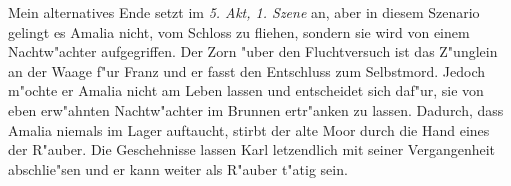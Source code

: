 Mein alternatives Ende setzt im \textit{5. Akt, 1. Szene} an, aber in diesem Szenario gelingt es Amalia nicht, vom Schloss zu fliehen, sondern sie wird von einem Nachtw"achter aufgegriffen. Der Zorn "uber den Fluchtversuch ist das Z"unglein an der Waage f"ur Franz und er fasst den Entschluss zum Selbstmord. Jedoch m"ochte er Amalia nicht am Leben lassen und entscheidet sich daf"ur, sie von eben erw"ahnten Nachtw"achter im Brunnen ertr"anken zu lassen.
Dadurch, dass Amalia niemals im Lager auftaucht, stirbt der alte Moor durch die Hand eines der R"auber. Die Geschehnisse lassen Karl letzendlich mit seiner Vergangenheit abschlie"sen und er kann weiter als R"auber t"atig sein.